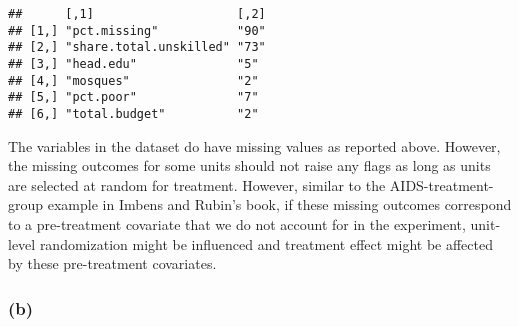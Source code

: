 \documentclass[]{article}
\newenvironment{Shaded}{\begin{snugshade}}{\end{snugshade}}
\newcommand{\CommentTok}[1]{\textcolor[rgb]{0.56,0.35,0.01}{\textit{#1}}}
\newcommand{\ControlFlowTok}[1]{\textcolor[rgb]{0.13,0.29,0.53}{\textbf{#1}}}
\newcommand{\DataTypeTok}[1]{\textcolor[rgb]{0.13,0.29,0.53}{#1}}
\newcommand{\DecValTok}[1]{\textcolor[rgb]{0.00,0.00,0.81}{#1}}
\newcommand{\KeywordTok}[1]{\textcolor[rgb]{0.13,0.29,0.53}{\textbf{#1}}}
\newcommand{\NormalTok}[1]{#1}
\newcommand{\OperatorTok}[1]{\textcolor[rgb]{0.81,0.36,0.00}{\textbf{#1}}}
\newcommand{\OtherTok}[1]{\textcolor[rgb]{0.56,0.35,0.01}{#1}}
\newcommand{\StringTok}[1]{\textcolor[rgb]{0.31,0.60,0.02}{#1}}
\begin{document}
\begin{verbatim}
##      [,1]                    [,2]
## [1,] "pct.missing"           "90"
## [2,] "share.total.unskilled" "73"
## [3,] "head.edu"              "5" 
## [4,] "mosques"               "2" 
## [5,] "pct.poor"              "7" 
## [6,] "total.budget"          "2"
\end{verbatim}

The variables in the dataset do have missing values as reported above.
However, the missing outcomes for some units should not raise any flags
as long as units are selected at random for treatment. However, similar
to the AIDS-treatment-group example in Imbens and Rubin's book, if these
missing outcomes correspond to a pre-treatment covariate that we do not
account for in the experiment, unit-level randomization might be
influenced and treatment effect might be affected by these pre-treatment
covariates.

\hypertarget{b-2}{%
\subsubsection{(b)}\label{b-2}}

\begin{Shaded}
\end{Shaded}
\end{document}
